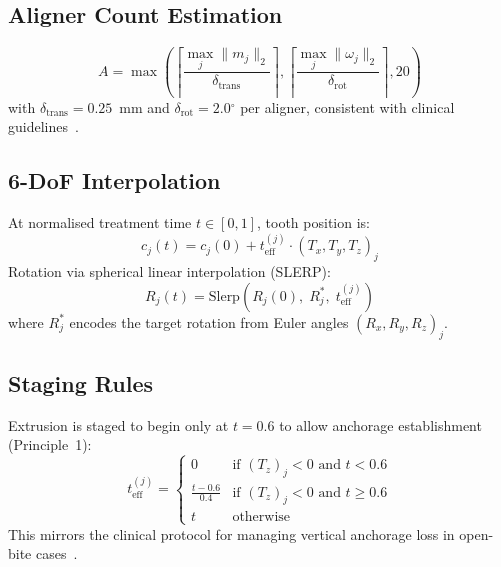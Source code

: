 \documentclass[10pt,twocolumn]{article}
\newcommand{\degree}{$^\circ$}
\begin{document}
\subsection{Aligner Count Estimation}

\begin{equation}
  A = \max\!\left(
    \left\lceil \frac{\max_j \|m_j\|_2}{\delta_{\text{trans}}} \right\rceil,
    \left\lceil \frac{\max_j \|\omega_j\|_2}{\delta_{\text{rot}}} \right\rceil,
    20
  \right)
\end{equation}
with $\delta_{\text{trans}} = 0.25$~mm and $\delta_{\text{rot}} = 2.0$\degree{}
per aligner, consistent with clinical guidelines~\cite{glaser2017invisalign}.

\subsection{6-DoF Interpolation}

At normalised treatment time $t \in [0,1]$, tooth position is:
\begin{equation}
  c_j(t) = c_j(0) + t_\text{eff}^{(j)} \cdot (T_x, T_y, T_z)_j
\end{equation}
Rotation via spherical linear interpolation (SLERP):
\begin{equation}
  R_j(t) = \text{Slerp}\!\left(R_j(0),\; R_j^*,\; t_\text{eff}^{(j)}\right)
\end{equation}
where $R_j^*$ encodes the target rotation from Euler angles $(R_x, R_y, R_z)_j$.

\subsection{Staging Rules}

Extrusion is staged to begin only at $t = 0.6$ to allow anchorage
establishment (Principle~1):
\begin{equation}
  t_\text{eff}^{(j)} =
    \begin{cases}
      0                    & \text{if } (T_z)_j < 0 \text{ and } t < 0.6 \\
      \frac{t - 0.6}{0.4}  & \text{if } (T_z)_j < 0 \text{ and } t \geq 0.6 \\
      t                    & \text{otherwise}
    \end{cases}
\end{equation}
This mirrors the clinical protocol for managing vertical anchorage loss
in open-bite cases~\cite{glaser2017invisalign}.

\end{document}

